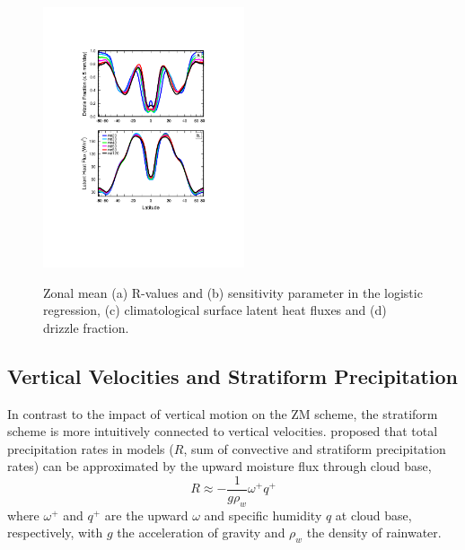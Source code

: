 \documentclass[times]{qjrms4}
\begin{document}
\begin{figure}
\begin{center}
\noindent\includegraphics[width=14pc,angle=0]{figs/temp_2zonal.pdf}\\
\end{center}
\caption{Zonal mean (a) R-values and (b) sensitivity parameter in the logistic regression, (c) climatological surface latent heat fluxes and (d) drizzle fraction.}
\label{fig:2zonal}
\end{figure}

\subsection{Vertical Velocities and Stratiform Precipitation}

In contrast to the impact of vertical motion on the ZM scheme, the stratiform scheme is more intuitively connected to vertical velocities. \cite{RETAL2016CD} proposed that total precipitation rates in models ($R$, sum of convective and stratiform precipitation rates) can be approximated by the upward moisture flux through cloud base,
\begin{equation}
R \approx -\frac{1}{g\rho_{w}} \omega^+ q^+ \label{eq:mflux}
\end{equation}
where $\omega^+$ and $q^+$ are the upward $\omega$ and specific humidity $q$ at cloud base, respectively, with $g$ the acceleration of gravity and $\rho_w$ the density of rainwater. 
\end{document}
